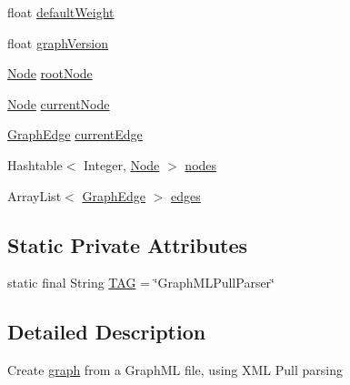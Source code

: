 \begin{DoxyCompactItemize}
\item 
float \hyperlink{classch_1_1zhaw_1_1ba10__bsha__1_1_1graph_1_1GraphMLPullParser_ad92f2d9a4a9f758ebac8b19b650f0759}{defaultWeight}
\item 
float \hyperlink{classch_1_1zhaw_1_1ba10__bsha__1_1_1graph_1_1GraphMLPullParser_a212c61eb8990534e883cda1e29c60589}{graphVersion}
\item 
\hyperlink{classch_1_1zhaw_1_1ba10__bsha__1_1_1graph_1_1Node}{Node} \hyperlink{classch_1_1zhaw_1_1ba10__bsha__1_1_1graph_1_1GraphMLPullParser_ae4185aa59926024ce10f7041d048d56f}{rootNode}
\item 
\hyperlink{classch_1_1zhaw_1_1ba10__bsha__1_1_1graph_1_1Node}{Node} \hyperlink{classch_1_1zhaw_1_1ba10__bsha__1_1_1graph_1_1GraphMLPullParser_a2281dbf08b291997a372d130efea7d07}{currentNode}
\item 
\hyperlink{classch_1_1zhaw_1_1ba10__bsha__1_1_1graph_1_1GraphMLPullParser_1_1GraphEdge}{GraphEdge} \hyperlink{classch_1_1zhaw_1_1ba10__bsha__1_1_1graph_1_1GraphMLPullParser_aa293c98ba213a9cbe6f6f48c82f5b706}{currentEdge}
\item 
Hashtable$<$ Integer, \hyperlink{classch_1_1zhaw_1_1ba10__bsha__1_1_1graph_1_1Node}{Node} $>$ \hyperlink{classch_1_1zhaw_1_1ba10__bsha__1_1_1graph_1_1GraphMLPullParser_acf2b3dbec13a253bc3667292157150c4}{nodes}
\item 
ArrayList$<$ \hyperlink{classch_1_1zhaw_1_1ba10__bsha__1_1_1graph_1_1GraphMLPullParser_1_1GraphEdge}{GraphEdge} $>$ \hyperlink{classch_1_1zhaw_1_1ba10__bsha__1_1_1graph_1_1GraphMLPullParser_a181a350c69c351b9f21d914202abaee4}{edges}
\end{DoxyCompactItemize}
\subsection*{Static Private Attributes}
\begin{DoxyCompactItemize}
\item 
static final String \hyperlink{classch_1_1zhaw_1_1ba10__bsha__1_1_1graph_1_1GraphMLPullParser_ab9f2c0c9b2d0193cb1fee32505e5bd9c}{TAG} = \char`\"{}GraphMLPullParser\char`\"{}
\end{DoxyCompactItemize}


\subsection{Detailed Description}
Create \hyperlink{namespacech_1_1zhaw_1_1ba10__bsha__1_1_1graph}{graph} from a GraphML file, using XML Pull parsing

